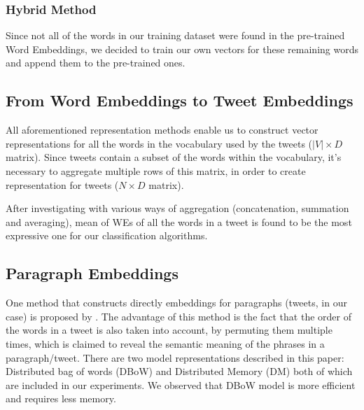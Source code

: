\subsubsection{Hybrid Method}
Since not all of the words in our training dataset were found in the pre-trained Word Embeddings, we decided to train our own vectors for these remaining words and append them to the pre-trained ones.


\subsection{From Word Embeddings to Tweet Embeddings}
All aforementioned representation methods enable us to construct vector representations for all the words in the vocabulary used by the tweets ($|V| \times D$ matrix).
Since tweets contain a subset of the words within the vocabulary, it's necessary to aggregate multiple rows of this matrix, in order to create representation for tweets ($N \times D$ matrix).

After investigating with various ways of aggregation (concatenation, summation and averaging), mean of WEs of all the words in a tweet is found to be the most expressive one for our classification algorithms.


\subsection{Paragraph Embeddings}
One method that constructs directly embeddings for paragraphs (tweets, in our case) is proposed by \cite{le2014distributed}.
The advantage of this method is the fact that the order of the words in a tweet is also taken into account, by permuting them multiple times, which is claimed to reveal the semantic meaning of the phrases in a paragraph/tweet.
There are two model representations described in this paper: Distributed bag of words (DBoW) and Distributed Memory (DM) both of which are included in our experiments.
We observed that DBoW model is more efficient and requires less memory.
